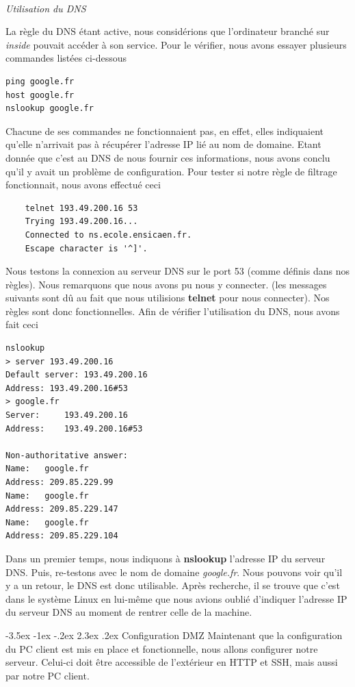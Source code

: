 \documentclass[a4paper,12pt]{article}
\makeatletter
\renewcommand\section{\@startsection {section}{1}{\z@}%
                           {-3.5ex \@plus -1ex \@minus -.2ex}%
                           {2.3ex \@plus.2ex}%
                           {\normalfont\Large\bfseries}}
\makeatother
\begin{document}
~

\textit{Utilisation du DNS}

La règle du DNS étant active, nous considérions que l'ordinateur branché sur \textit{inside} pouvait accéder à son service. Pour le vérifier, nous avons
essayer plusieurs commandes listées ci-dessous
\begin{lstlisting}
ping google.fr
host google.fr
nslookup google.fr
\end{lstlisting}

Chacune de ses commandes ne fonctionnaient pas, en effet, elles indiquaient qu'elle n'arrivait pas à récupérer l'adresse IP lié au nom de domaine. Etant
donnée que c'est au DNS de nous fournir ces informations, nous avons conclu qu'il y avait un problème de configuration. Pour tester si notre règle de 
filtrage fonctionnait, nous avons effectué ceci
\begin{lstlisting}
	telnet 193.49.200.16 53
	Trying 193.49.200.16...
	Connected to ns.ecole.ensicaen.fr.
	Escape character is '^]'.
\end{lstlisting}

Nous testons la connexion au serveur DNS sur le port 53 (comme définis dans nos règles). Nous remarquons que nous avons pu nous y connecter. (les messages
suivants sont dû au fait que nous utilisions \textbf{telnet} pour nous connecter). Nos règles sont donc fonctionnelles. Afin de vérifier l'utilisation du DNS,
nous avons fait ceci
\begin{lstlisting}
nslookup
> server 193.49.200.16
Default server: 193.49.200.16
Address: 193.49.200.16#53
> google.fr
Server:		193.49.200.16
Address:	193.49.200.16#53

Non-authoritative answer:
Name:	google.fr
Address: 209.85.229.99
Name:	google.fr
Address: 209.85.229.147
Name:	google.fr
Address: 209.85.229.104
\end{lstlisting}

Dans un premier temps, nous indiquons à \textbf{nslookup} l'adresse IP du serveur DNS. Puis, re-testons avec le nom de domaine \textit{google.fr}.
Nous pouvons voir qu'il y a un retour, le DNS est donc utilisable. Après recherche, il se trouve que c'est dans le système Linux en lui-même que 
nous avions oublié d'indiquer l'adresse IP du serveur DNS au moment de rentrer celle de la machine.


\newpage
\section{Configuration DMZ}
Maintenant que la configuration du PC client est mis en place et fonctionnelle, nous allons configurer notre serveur. Celui-ci doit être accessible de 
l'extérieur en HTTP et SSH, mais aussi par notre PC client.
\end{document}
